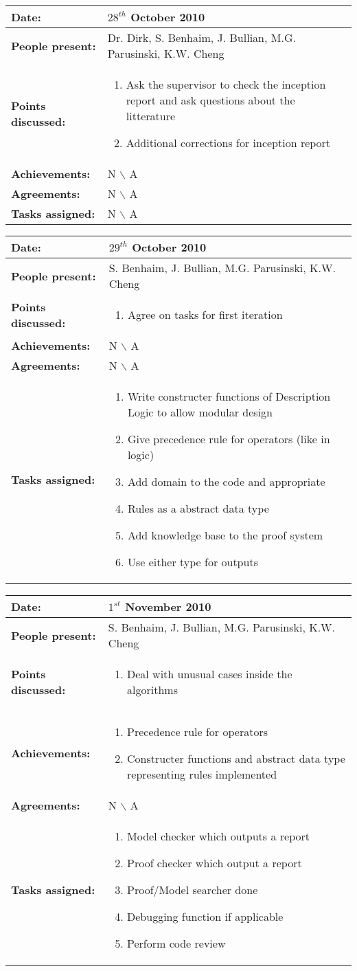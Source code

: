 \documentclass[12pt,a4paper]{article}
\newcommand{\meeting}[6]{%
\begin{center}%
\begin{longtable}{| p{3.5cm} | | p{13cm} |}%
\hline%
\textbf{Date:} & #1 \\%
\hline%
\textbf{People present:} &#2 \\%
\hline%
\textbf{Points discussed:} &#3\\%
\hline%
\textbf{Achievements:} &#4 \\%
\hline%
\textbf{Agreements:} &#5 \\%
\hline%
\textbf{Tasks assigned:} &#6  \\%
\hline%
\end{longtable}%
\end{center}%
\bigbreak
}
\begin{document}
\meeting{$28^{th}$ October 2010}%
{Dr. Dirk, S. Benhaim, J. Bullian, M.G. Parusinski, K.W. Cheng}%
{ \begin{enumerate} 
\item Ask the supervisor to check the inception report and ask questions about the litterature
\item Additional corrections for inception report
\end{enumerate} }%
{ N $\backslash$ A}%
{N $\backslash$ A}
{N $\backslash$ A}%

\meeting{$29^{th}$ October 2010}%
{S. Benhaim, J. Bullian, M.G. Parusinski, K.W. Cheng}%
{ \begin{enumerate} 
\item Agree on tasks for first iteration
\end{enumerate} }%
{ N $\backslash$ A}%
{N $\backslash$ A}
{\begin{enumerate}
\item Write constructer functions of Description Logic to allow modular design
\item Give precedence rule for operators (like in logic)
\item Add domain to the code and appropriate
\item Rules as a abstract data type
\item Add knowledge base to the proof system
\item Use either type for outputs
\end{enumerate}}%

\meeting{$1^{st}$ November 2010}%
{S. Benhaim, J. Bullian, M.G. Parusinski, K.W. Cheng}%
{\begin{enumerate} 
\item  Deal with unusual cases inside the algorithms
\end{enumerate} }%
{\begin{enumerate}
\item Precedence rule for operators
\item Constructer functions and abstract data type representing rules implemented
\end{enumerate}}%
{N $\backslash$ A}
{\begin{enumerate}
\item Model checker which outputs a report
\item Proof checker which output a report
\item Proof/Model searcher done
\item Debugging function if applicable
\item Perform code review
\end{enumerate}}%
\end{document}
